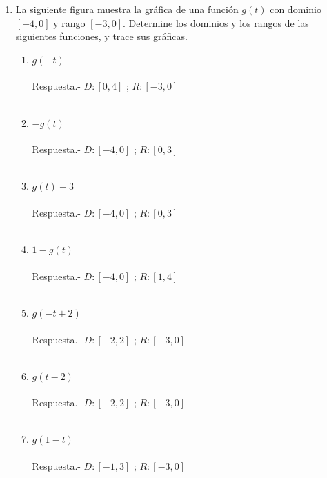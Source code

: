 \begin{enumerate}
\begin{enumerate}[\bfseries a)]
    \end{enumerate}

\item La siguiente figura muestra la gráfica de una función $g(t)$ con dominio $[-4, 0]$ y rango $[-3, 0]$. Determine los dominios y los rangos de las siguientes funciones, y trace sus gráficas.
    \begin{enumerate}[\bfseries a)]

	\item $g(-t)$\\\\
	    Respuesta.-\; $D:[0,4]$ ; $R:[-3,0]$\\\\

	\item $-g(t)$\\\\
	    Respuesta.-\; $D:[-4,0]$ ; $R:[0,3]$\\\\

	\item $g(t)+3$\\\\
	    Respuesta.-\; $D:[-4,0]$ ; $R:[0,3]$\\\\

	\item $1-g(t)$\\\\
	    Respuesta.-\; $D:[-4,0]$ ; $R:[1,4]$\\\\

	\item $g(-t+2)$\\\\
	    Respuesta.-\; $D:[-2,2]$ ; $R:[-3,0]$\\\\

	\item $g(t-2)$\\\\
	    Respuesta.-\; $D:[-2,2]$ ; $R:[-3,0]$\\\\

	\item $g(1-t)$\\\\
	    Respuesta.-\; $D:[-1,3]$ ; $R:[-3,0]$\\\\


\end{enumerate}
\end{enumerate}
